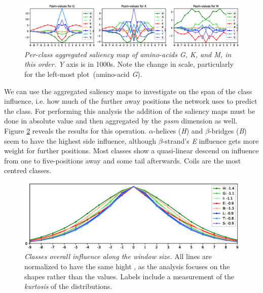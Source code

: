 		\begin{figure}
			\centering
			\includegraphics[width=1\linewidth]{Figures/class_agg_aa}
			\caption{\textit{Per-class aggregated saliency map of amino-acids G, K, and M, in this order.} \textit{Y} axis is in 1000s. Note the change in scale, particularly for the left-most plot~(amino-acid \textit{G}).}
			\label{fig:class_agg_aa}
		\end{figure}
		
		We can use the aggregated saliency maps to investigate on the span of the class influence, i.e. how much of the further away positions the network uses to predict the class. For performing this analysis the addition of the saliency maps must be done in absolute value and then aggregated by the \textit{pssm} dimension as well. Figure \ref{fig:sheer_class_aa} reveals the results for this operation. $\alpha$-helices (\textit{H}) and $\beta$-bridges (\textit{B}) seem to have the highest side influence, although $\beta$-strand's \textit{E} influence gets more weight for further positions. Most classes show a quasi-linear descend on influence from one to five-positions away and some tail afterwards. Coils are the most centred classes.

		\begin{figure}
			\centering
			\includegraphics[width=1\linewidth]{Figures/sheer_class_aa}
			\caption{\textit{Classes overall influence along the window size.} All lines are normalized to have the same hight , as the analysis focuses on the shapes rather than the values. Labels include a measurement of the \textit{kurtosis} of the distributions.}
			\label{fig:sheer_class_aa}
		\end{figure}


	
